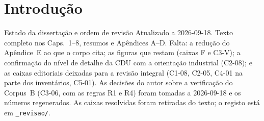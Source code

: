 
\chapter{Introdução}
\label{cha:introducao}
{Estado da dissertação e ordem de revisão}
{Atualizado a 2026-09-18. Texto completo nos Caps.~1--8, resumos e
Apêndices A--D. Falta: a redução do Apêndice~E ao que o corpo cita; as
figuras que restam (caixas F e C3-V); a confirmação do nível de detalhe da
CDU com a orientação industrial (C2-08); e as caixas editoriais deixadas
para a revisão integral (C1-08, C2-05, C4-01 na parte dos inventários,
C5-01). As decisões do autor sobre a verificação do Corpus~B (C3-06, com as
regras R1 e R4) foram tomadas a 2026-09-18 e os números regenerados. As
caixas resolvidas foram retiradas do texto; o registo está em
\texttt{\_revisao/}.}%

